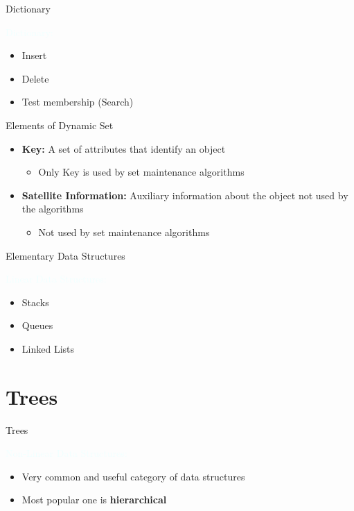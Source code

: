 \documentclass{beamer}
\newcommand{\tblue}[1]{{\Large {\textcolor{azure}{#1}}}}
\begin{document}
\begin{frame}{Dictionary}

\tblue{Dictionary:}
\begin{itemize}
\item Insert
\item Delete
\item Test membership (Search)
\end{itemize}
\end{frame}


\begin{frame}{Elements of Dynamic Set}
\begin{itemize}
\item {\bf Key:} A set of attributes that identify an object 
\begin{itemize}
    \item Only Key is used by set maintenance algorithms
\end{itemize}
\item {\bf Satellite Information:} Auxiliary information about the object not used by the algorithms
\begin{itemize}
    \item Not used by set maintenance algorithms
\end{itemize}
\end{itemize}
\end{frame}


\begin{frame}{Elementary Data Structures}

\tblue{Linear Data Structures:}
\begin{itemize}
\item Stacks
\item Queues
\item Linked Lists
\end{itemize}
\end{frame}



\section{Trees}

\begin{frame}{Trees}

\tblue{Non-Linear Data Structures:}
\begin{itemize}
\item Very common and useful category of data structures
\item Most popular one is {\bf hierarchical}
\end{itemize}
\end{frame}
\end{document}
